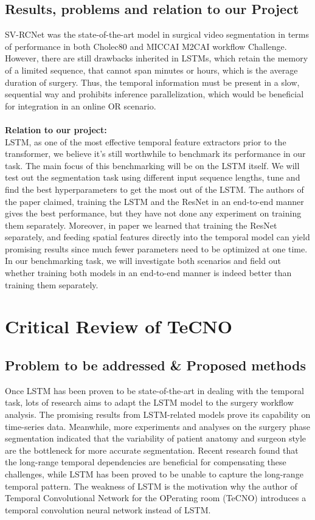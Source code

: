\documentclass[11pt]{article} \usepackage[top=1in, bottom=1in, left=1in, right=1in]{geometry}
\begin{document}
\subsection{Results, problems and relation to our Project}
SV-RCNet was the state-of-the-art model in surgical video segmentation in terms of performance in both Cholec80 and MICCAI M2CAI workflow Challenge. However, there are still drawbacks inherited in LSTMs, which retain the memory of a limited sequence, that cannot span minutes or hours, which is the average duration of surgery. Thus, the temporal information must be present in a slow, sequential way and prohibits inference parallelization, which would be beneficial for integration in an online OR scenario.
\\\\\textbf{Relation to our project:}
\\LSTM, as one of the most effective temporal feature extractors prior to the transformer, we believe it’s still worthwhile to benchmark its performance in our task. The main focus of this benchmarking will be on the LSTM itself. We will test out the segmentation task using different input sequence lengths, tune and find the best hyperparameters to get the most out of the LSTM.  The authors of the paper \cite{SV-RCNet} claimed, training the LSTM and the ResNet in an end-to-end manner gives the best performance, but they have not done any experiment on training them separately. Moreover, in paper \cite{TeCNO} we learned that training the ResNet separately, and feeding spatial features directly into the temporal model can yield promising results since much fewer parameters need to be optimized at one time. In our benchmarking task, we will investigate both scenarios and field out whether training both models in an end-to-end manner is indeed better than training them separately. 
\section{Critical Review of TeCNO}
\subsection{Problem to be addressed \& Proposed methods}
Once LSTM has been proven to be state-of-the-art in dealing with the temporal task, lots of research aims to adapt the LSTM model to the surgery workflow analysis. The promising results from LSTM-related models prove its capability on time-series data. Meanwhile, more experiments and analyses on the surgery phase segmentation indicated that the variability of patient anatomy and surgeon style are the bottleneck for more accurate segmentation. Recent research found that the long-range temporal dependencies are beneficial for compensating these challenges, while LSTM has been proved to be unable to capture the long-range temporal pattern. The weakness of LSTM  is the motivation why the author of Temporal Convolutional Network for the OPerating room (TeCNO) introduces a temporal convolution neural network instead of LSTM. 
\end{document}
